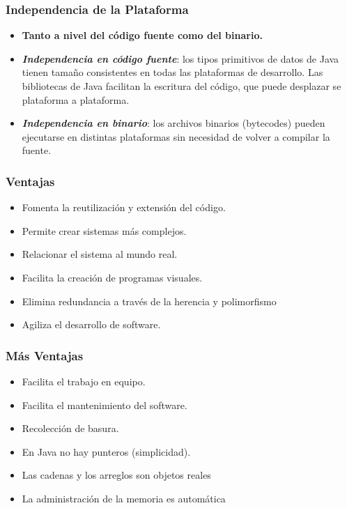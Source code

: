 \documentclass{beamer}
\begin{document}
\begin{frame}
  \frametitle{Independencia de la Plataforma}
  
    \begin{itemize}
    \item \textbf{Tanto a nivel del código fuente como del binario.}



      \item \emph{\bf Independencia en código fuente}: los tipos
        primitivos de datos de Java tienen tama\~no consistentes en
        todas las plataformas de desarrollo. Las bibliotecas de Java
        facilitan la escritura del código, que puede desplazar se
        plataforma a plataforma.

      \item \emph{\bf Independencia en binario}: los archivos binarios
        (bytecodes) pueden ejecutarse en distintas plataformas sin
        necesidad de volver a compilar la fuente.
        
      
    \end{itemize}
  
\end{frame}

\begin{frame}
  \frametitle{Ventajas}
    \begin{itemize}
    \item Fomenta la reutilización y extensión del código.
    \item Permite crear sistemas más complejos.
    \item Relacionar el sistema al mundo real.
    \item Facilita la creación de programas visuales.
    \item Elimina redundancia a través de la herencia y polimorfismo
    \item Agiliza el desarrollo de software.
    \end{itemize}
\end{frame}

\begin{frame}
  \frametitle{Más Ventajas}  
    \begin{itemize}
    \item Facilita el trabajo en equipo.
    \item Facilita el mantenimiento del software.
    \item Recolección de basura.
    \item En Java no hay punteros (simplicidad).
    \item Las cadenas y los arreglos son objetos reales
    \item La administración de la memoria es automática
    \end{itemize}
\end{frame}
\end{document}

